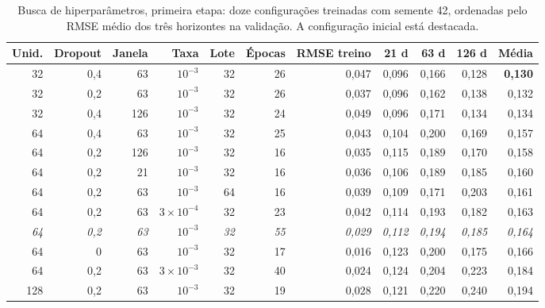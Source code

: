 \begin{table}[htb]
	\centering
	\caption{Busca de hiperparâmetros, primeira etapa: doze configurações treinadas com semente 42, ordenadas pelo RMSE médio dos três horizontes na validação. A configuração inicial está destacada.}\label{tab:rq1-hp-grade}
	\footnotesize
	\setlength{\tabcolsep}{3.5pt}
	\begin{tabular}{r r r r r r r r r r r}
		\hline
		\textbf{Unid.} & \textbf{Dropout} & \textbf{Janela} & \textbf{Taxa} & \textbf{Lote} & \textbf{Épocas} & \textbf{RMSE treino} & \textbf{21 d} & \textbf{63 d} & \textbf{126 d} & \textbf{Média} \\ \hline
		32  & 0,4 & 63  & $10^{-3}$          & 32 & 26 & 0,047 & 0,096 & 0,166 & 0,128 & \textbf{0,130} \\
		32  & 0,2 & 63  & $10^{-3}$          & 32 & 26 & 0,037 & 0,096 & 0,162 & 0,138 & 0,132 \\
		32  & 0,4 & 126 & $10^{-3}$          & 32 & 24 & 0,049 & 0,096 & 0,171 & 0,134 & 0,134 \\
		64  & 0,4 & 63  & $10^{-3}$          & 32 & 25 & 0,043 & 0,104 & 0,200 & 0,169 & 0,157 \\
		64  & 0,2 & 126 & $10^{-3}$          & 32 & 16 & 0,035 & 0,115 & 0,189 & 0,170 & 0,158 \\
		64  & 0,2 & 21  & $10^{-3}$          & 32 & 16 & 0,036 & 0,106 & 0,189 & 0,185 & 0,160 \\
		64  & 0,2 & 63  & $10^{-3}$          & 64 & 16 & 0,039 & 0,109 & 0,171 & 0,203 & 0,161 \\
		64  & 0,2 & 63  & $3 \times 10^{-4}$ & 32 & 23 & 0,042 & 0,114 & 0,193 & 0,182 & 0,163 \\
		\textit{64} & \textit{0,2} & \textit{63} & $\mathit{10^{-3}}$ & \textit{32} & \textit{55} & \textit{0,029} & \textit{0,112} & \textit{0,194} & \textit{0,185} & \textit{0,164} \\
		64  & 0   & 63  & $10^{-3}$          & 32 & 17 & 0,016 & 0,123 & 0,200 & 0,175 & 0,166 \\
		64  & 0,2 & 63  & $3 \times 10^{-3}$ & 32 & 40 & 0,024 & 0,124 & 0,204 & 0,223 & 0,184 \\
		128 & 0,2 & 63  & $10^{-3}$          & 32 & 19 & 0,028 & 0,121 & 0,220 & 0,240 & 0,194 \\ \hline
	\end{tabular}
\end{table}

